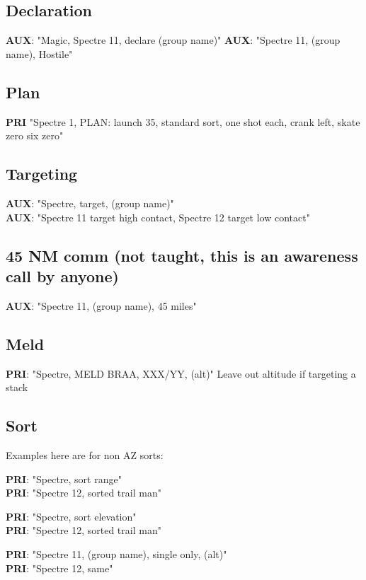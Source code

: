 \subsection{Declaration}

\textbf{AUX}: "Magic, Spectre 11, declare (group name)"
\textbf{AUX}: "Spectre 11, (group name), Hostile"

\subsection{Plan}

\textbf{PRI} "Spectre 1, PLAN: launch 35, standard sort, one
shot each, crank left, skate zero six zero"

\subsection*{Targeting}

\textbf{AUX}: "Spectre, target, (group name)" \\
\textbf{AUX}: "Spectre 11 target high contact, Spectre 12 target low contact"

\subsection*{45 NM comm (not taught, this is an awareness call by anyone)}

\textbf{AUX}: "Spectre 11, (group name), 45 miles"

\subsection*{Meld}

\textbf{PRI}: "Spectre, MELD BRAA, XXX/YY, (alt)" Leave out altitude if
targeting a stack

\newpage

\subsection*{Sort}

Examples here are for non AZ sorts:

\textbf{PRI}: "Spectre, sort range"\\
\textbf{PRI}: "Spectre 12, sorted trail man"

\textbf{PRI}: "Spectre, sort elevation"\\
\textbf{PRI}: "Spectre 12, sorted trail man"

\textbf{PRI}: "Spectre 11, (group name), single only, (alt)"\\
\textbf{PRI}: "Spectre 12, same"

